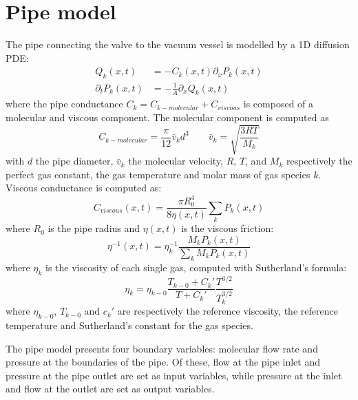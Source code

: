 \documentclass[letterpaper, 10pt, conference]{ieeeconf}
\begin{document}
\section{Pipe model}\label{sec:pipemdl}
The pipe connecting the valve to the vacuum vessel is modelled by a 1D diffusion PDE:
\begin{equation}
    \begin{aligned}
    Q_k(x,t) &= - C_k(x,t)\partial_x P_k(x,t) \\
    \partial_t P_k(x,t) &= -\frac{1}{A} \partial_x Q_k(x,t)
    \end{aligned}
\end{equation}
where the pipe conductance $C_k = C_{k-molecular}+C_{viscous}$ is composed of a molecular and viscous component. The molecular component is computed as
\begin{equation}
    C_{k-molecular} = \frac{\pi}{12}\bar{v}_kd^3 \qquad \bar{v}_k = \sqrt{\frac{3RT}{M_k}}
\end{equation}
with $d$ the pipe diameter, $\bar{v}_k$ the molecular velocity, $R$, $T$, and $M_k$ respectively the perfect gas constant, the gas temperature and molar mass of gas species $k$. Viscous conductance is computed as:
\begin{equation}
    C_{viscous} (x,t) = \frac{\pi R_0^4}{8\eta(x,t)} \sum_k P_k(x,t)
\end{equation}
where $R_0$ is the pipe radius and $\eta(x,t)$ is the viscous friction:
\begin{equation}
    \eta^{-1}(x,t) = \eta_k^{-1} \frac{M_k P_k(x,t)}{\displaystyle\sum_k M_k P_k(x,t)} 
\end{equation}
where $\eta_k$ is the viscosity of each single gas, computed with Sutherland's formula:
\begin{equation}
    \eta_k = \eta_{k-0} \frac{T_{k-0} + C_k\prime}{T + C_k\prime}\frac{T^{3/2}}{T_k^{3/2}}
\end{equation}
where $\eta_{k-0}$, $T_{k-0}$ and $c_k\prime$ are respectively the reference viscosity, the reference temperature and Sutherland's constant for the gas species.

The pipe model presents four boundary variables: molecular flow rate  and pressure at the boundaries of the pipe. Of these, flow at the pipe inlet and pressure at the pipe outlet are set as input variables, while pressure at the inlet and flow at the outlet are set as output variables.
\end{document}
